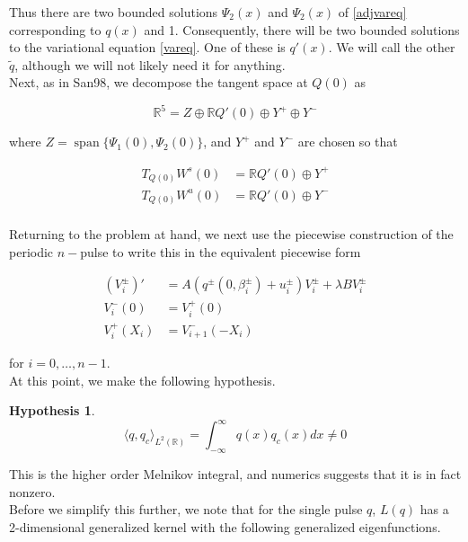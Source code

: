 \documentclass[12pt]{article}
\def\R{{\mathbb R}}
\DeclareMathOperator{\spn}{span}
\newtheorem{hypothesis}{Hypothesis}
\begin{document}
Thus there are two bounded solutions $\Psi_2(x)$ and $\Psi_2(x)$ of \eqref{adjvareq} corresponding to $q(x)$ and 1. Consequently, there will be two bounded solutions to the variational equation \eqref{vareq}. One of these is $q'(x)$. We will call the other $\tilde{q}$, although we will not likely need it for anything.\\

Next, as in San98, we decompose the tangent space at $Q(0)$ as

\begin{equation}
\R^5 = Z \oplus \R Q'(0) \oplus Y^+ \oplus Y^-
\end{equation}

where $Z = \spn\{ \Psi_1(0), \Psi_2(0) \}$, and $Y^+$ and $Y^-$ are chosen so that

\begin{align*}
T_{Q(0)} W^s(0) &= \R Q'(0) \oplus Y^+ \\
T_{Q(0)} W^u(0) &= \R Q'(0) \oplus Y^- \\
\end{align*}

Returning to the problem at hand, we next use the piecewise construction of the periodic $n-$pulse to write this in the equivalent piecewise form

\begin{align*}
(V_i^\pm)' &= A( q^\pm(0, \beta_i^\pm) + u_i^\pm) V_i^\pm + \lambda B V_i^\pm \\
V_i^-(0) &= V_i^+(0) \\
V_i^+(X_i) &= V_{i+1}^-(-X_i) 
\end{align*}

for $i = 0, \dots, n-1$. \\

At this point, we make the following hypothesis.

\begin{hypothesis}\label{higherMelnikov}
\begin{equation}\label{higherMelnikovnonzero}
\langle q, q_c \rangle_{L^2(\R)} = \int_{-\infty}^\infty q(x) q_c(x) dx \neq 0
\end{equation}
\end{hypothesis}

This is the higher order Melnikov integral, and numerics suggests that it is in fact nonzero.\\

Before we simplify this further, we note that for the single pulse $q$, $L(q)$ has a 2-dimensional generalized kernel with the following generalized eigenfunctions.
\end{document}
